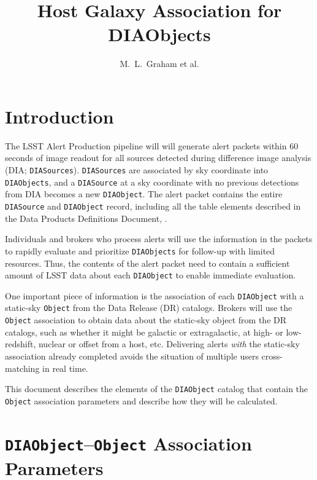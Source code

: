 \documentclass[DM,authoryear,toc]{lsstdoc}
\title{Host Galaxy Association for DIAObjects}
\author{%
M.~L.~Graham et al.
}
\date{\vcsDate}
\begin{document}
\maketitle

\section{Introduction} \label{sec:intro}

The LSST Alert Production pipeline will will generate alert packets within $60$ seconds of image readout for all sources detected during difference image analysis (DIA; {\tt DIASources}).
{\tt DIASources} are associated by sky coordinate into {\tt DIAObjects}, and a {\tt DIASource} at a sky coordinate with no previous detections from DIA becomes a new {\tt DIAObject}.
The alert packet contains the entire {\tt DIASource} and {\tt DIAObject} record, including all the table elements described in the Data Products Definitions Document, . 

Individuals and brokers who process alerts will use the information in the packets to rapidly evaluate and prioritize {\tt DIAObjects} for follow-up with limited resources.
Thus, the contents of the alert packet need to contain a sufficient amount of LSST data about each {\tt DIAObject} to enable immediate evaluation.

One important piece of information is the association of each {\tt DIAObject} with a static-sky {\tt Object} from the Data Release (DR) catalogs.
Brokers will use the {\tt Object} association to obtain data about the static-sky object from the DR catalogs, such as whether it might be galactic or extragalactic, at high- or low-redshift, nuclear or offset from a host, etc.
Delivering alerts \emph{with} the static-sky association already completed avoids the situation of multiple users cross-matching in real time.

This document describes the elements of the {\tt DIAObject} catalog that contain the {\tt Object} association parameters and describe how they will be calculated. 


\section{{\tt DIAObject}--{\tt Object} Association Parameters}\label{sec:params}
\end{document}
